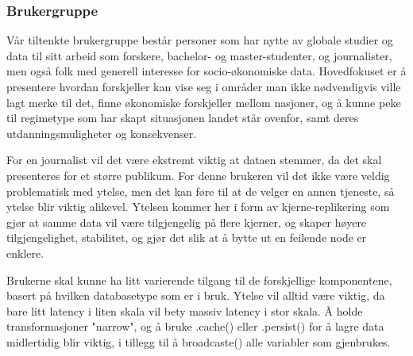 \subsubsection{Brukergruppe}
Vår tiltenkte brukergruppe består personer som har nytte av globale studier og data til sitt arbeid som forskere, bachelor- og master-studenter, og journalister, men også folk med generell interesse for socio-økonomiske data. Hovedfokuset er å presentere hvordan forskjeller kan vise seg i områder man ikke nødvendigvis ville lagt merke til det, finne økonomiske forskjeller mellom nasjoner, og å kunne peke til regimetype som har skapt situasjonen landet står ovenfor, samt deres utdanningsmuligheter og konsekvenser.

For en journalist vil det være ekstremt viktig at dataen stemmer, da det skal presenteres for et større publikum. For denne brukeren vil det ikke være veldig problematisk med ytelse, men det kan føre til at de velger en annen tjeneste, så ytelse blir viktig alikevel. Ytelsen kommer her i form av kjerne-replikering som gjør at samme data vil være tilgjengelig på flere kjerner, og skaper høyere tilgjengelighet, stabilitet, og gjør det slik at å bytte ut en feilende node er enklere.

Brukerne skal kunne ha litt varierende tilgang til de forskjellige komponentene, basert på hvilken databasetype som er i bruk. Ytelse vil alltid være viktig, da bare litt latency i liten skala vil bety massiv latency i stor skala. Å holde transformasjoner "narrow", og å bruke .cache() eller .persist() for å lagre data midlertidig blir viktig, i tillegg til å broadcaste() alle variabler som gjenbrukes.
